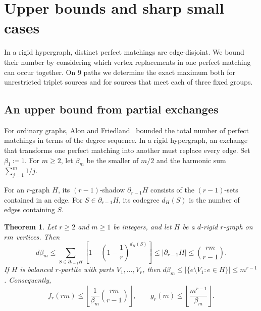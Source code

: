 \documentclass[10pt]{article}
\numberwithin{equation}{section}
\newtheorem{theorem}{Theorem}[section]
\theoremstyle{definition}
\begin{document}
\section{Upper bounds and sharp small cases}\label{sec:finite}

In a rigid hypergraph, distinct perfect matchings are edge-disjoint. We bound their number by considering which vertex replacements in one perfect matching can occur together. On 9 paths we determine the exact maximum both for unrestricted triplet sources and for sources that meet each of three fixed groups.

\subsection{An upper bound from partial exchanges}\label{sec:harmonic}

For ordinary graphs, Alon and Friedland~\cite{AlonFriedland2008} bounded the total number of perfect matchings in terms of the degree sequence. In a rigid hypergraph, an exchange that transforms one perfect matching into another must replace every edge. Set $\beta_1\coloneqq1$. For $m\ge2$, let $\beta_m$ be the smaller of $m/2$ and the harmonic sum $\sum_{j=1}^m 1/j$.

For an $r$-graph $H$, its $(r-1)$-shadow $\partial_{r-1}H$ consists of the $(r-1)$-sets contained in an edge. For $S\in\partial_{r-1}H$, its codegree $d_H(S)$ is the number of edges containing $S$.

\begin{theorem}\label{thm:dimension-upper}
Let $r\ge2$ and $m\ge1$ be integers, and let $H$ be a $d$-rigid $r$-graph on $rm$ vertices. Then
\begin{equation}
 d\beta_m \le\sum_{S\in\partial_{r-1}H}
 \left[1-\left(1-\frac1r\right)^{d_H(S)}\right]
 \le |\partial_{r-1}H|\le\binom{rm}{r-1}.
 \label{eq:harmonic-shadow}
\end{equation}
If $H$ is balanced $r$-partite with parts $V_1,\ldots,V_r$, then $d\beta_m\le\bigl|\{e\setminus V_1\colon e\in H\}\bigr|\le m^{r-1}$.
Consequently,
\begin{equation}
 f_r(rm)\le\left\lfloor\frac{1}{\beta_m}\binom{rm}{r-1}\right\rfloor,\qquad
 g_r(m)\le\left\lfloor\frac{m^{r-1}}{\beta_m}\right\rfloor.
 \label{eq:harmonic-extremal}
\end{equation}
\end{theorem}
\end{document}
